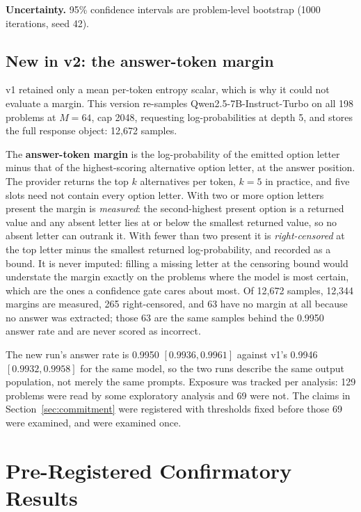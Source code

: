 \documentclass{article}
\begin{document}
\textbf{Uncertainty.} 95\% confidence intervals are problem-level bootstrap
(1000 iterations, seed 42).


\subsection{New in v2: the answer-token margin}
\label{sec:margin-setup}

v1 retained only a mean per-token entropy scalar, which is why it could not
evaluate a margin. This version re-samples Qwen2.5-7B-Instruct-Turbo on all 198
problems at $M=64$, cap 2048, requesting log-probabilities at depth 5, and
stores the full response object: 12,672 samples.

The \textbf{answer-token margin} is the log-probability of the emitted option
letter minus that of the highest-scoring alternative option letter, at the
answer position. The provider returns the top $k$ alternatives per token,
$k=5$ in practice, and five slots need not contain every option letter. With
two or more option letters present the margin is \emph{measured}: the
second-highest present option is a returned value and any absent letter lies at
or below the smallest returned value, so no absent letter can outrank it. With
fewer than two present it is \emph{right-censored} at the top letter minus the
smallest returned log-probability, and recorded as a bound. It is never
imputed: filling a missing letter at the censoring bound would understate the
margin exactly on the problems where the model is most certain, which are the
ones a confidence gate cares about most. Of 12,672 samples, 12,344 margins are
measured, 265 right-censored, and 63 have no margin at all because no answer
was extracted; those 63 are the same samples behind the 0.9950 answer rate and
are never scored as incorrect.

The new run's answer rate is 0.9950 $[0.9936, 0.9961]$ against v1's 0.9946
$[0.9932, 0.9958]$ for the same model, so the two runs describe the same output
population, not merely the same prompts. Exposure was tracked per analysis: 129
problems were read by some exploratory analysis and 69 were not. The claims in
Section~\ref{sec:commitment} were registered with thresholds fixed before those
69 were examined, and were examined once.

\section{Pre-Registered Confirmatory Results}
\end{document}
